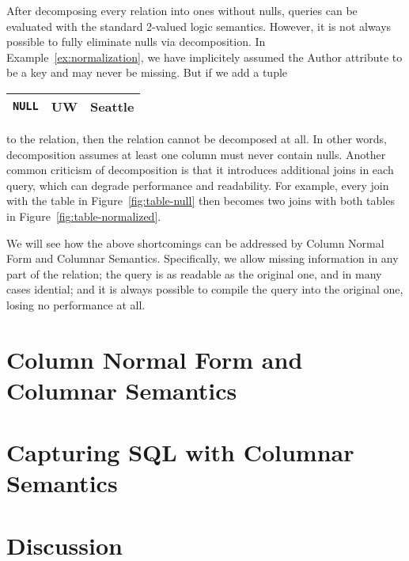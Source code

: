 \documentclass[sigconf]{acmart}
\begin{document}
After decomposing every relation into ones without nulls,
 queries can be evaluated with the standard 2-valued logic semantics.
However, it is not always possible to fully eliminate nulls via decomposition.
In Example~\ref{ex:normalization}, 
 we have implicitely assumed the \textsf{Author} attribute 
 to be a key and may never be missing.
But if we add a tuple 
%
\begin{tabular}{|c|c|c|}
\hline
\lstinline|NULL| & UW & Seattle\\
\hline
\end{tabular}
%
 to the relation, 
 then the relation cannot be decomposed at all.
In other words, decomposition assumes at least one column must never contain nulls. 
Another common criticism of decomposition is that
 it introduces additional joins in each query, 
 which can degrade performance and readability.
For example, every join with the table in Figure~\ref{fig:table-null}
 then becomes two joins with both tables in Figure~\ref{fig:table-normalized}.

We will see how the above shortcomings can be addressed 
 by Column Normal Form and Columnar Semantics.
Specifically, we allow missing information in any part of the relation;
 the query is as readable as the original one, and in many cases idential;
 and it is always possible to compile the query into the original one,
 losing no performance at all.

\section{Column Normal Form and Columnar Semantics}
\label{sec:cnf}

\section{Capturing SQL with Columnar Semantics}
\label{sec:cv3}

\section{Discussion}
\label{sec:conclusion}



\end{document}
